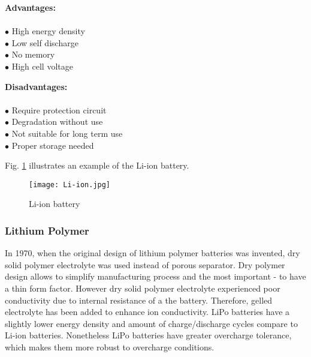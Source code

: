 \begin{multicols}{2}
	
	\textbf{Advantages:} \\ \\
	$\bullet$ High energy density\\
	$\bullet$ Low self discharge\\
	$\bullet$ No memory\\
	$\bullet$ High cell voltage\\
	
	
	
	
	\columnbreak
	
	\textbf{Disadvantages:} \\ \\
	$\bullet$ Require protection circuit\\
	$\bullet$ Degradation without use\\
	$\bullet$ Not suitable for long term use\\
	$\bullet$ Proper storage needed 

	
	
\end{multicols}

Fig. \ref{fig: lion} illustrates an example of the Li-ion battery. 

\begin{figure}[h]
	\centering
	\texttt{[image: Li-ion.jpg]}
	\caption{ Li-ion battery \cite{11}}
	\label{fig: lion}
\end{figure}

\subsubsection{Lithium Polymer \label{sec:tech}}

In 1970, when the original design of lithium polymer batteries was invented, dry solid polymer electrolyte was used instead of  porous separator. Dry polymer design allows to simplify manufacturing process and the most important - to have a thin form factor. However dry solid polymer electrolyte experienced poor conductivity due to internal resistance of a the battery. Therefore, gelled electrolyte has been added to enhance ion conductivity. LiPo batteries have a slightly lower energy density and amount of charge/discharge cycles compare to Li-ion batteries. Nonetheless LiPo batteries have greater overcharge tolerance, which makes them more robust to overcharge conditions.


